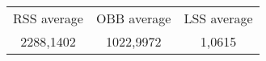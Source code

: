 \begin{tabular}{c|c|c}\\ 
RSS average & OBB average & LSS average\\ 
2288,1402 & 1022,9972 & 1,0615\\ 
\end{tabular}